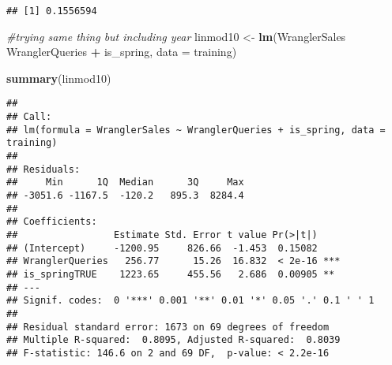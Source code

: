 \documentclass[]{article}
\newenvironment{Shaded}{\begin{snugshade}}{\end{snugshade}}
\newcommand{\KeywordTok}[1]{\textcolor[rgb]{0.13,0.29,0.53}{\textbf{#1}}}
\newcommand{\DataTypeTok}[1]{\textcolor[rgb]{0.13,0.29,0.53}{#1}}
\newcommand{\DecValTok}[1]{\textcolor[rgb]{0.00,0.00,0.81}{#1}}
\newcommand{\StringTok}[1]{\textcolor[rgb]{0.31,0.60,0.02}{#1}}
\newcommand{\CommentTok}[1]{\textcolor[rgb]{0.56,0.35,0.01}{\textit{#1}}}
\newcommand{\OperatorTok}[1]{\textcolor[rgb]{0.81,0.36,0.00}{\textbf{#1}}}
\newcommand{\NormalTok}[1]{#1}
\begin{document}
\begin{verbatim}
## [1] 0.1556594
\end{verbatim}

\begin{Shaded}
\begin{Highlighting}[]
\CommentTok{#trying same thing but including year}
\NormalTok{linmod10 <-}\StringTok{ }\KeywordTok{lm}\NormalTok{(WranglerSales }\OperatorTok{~}\StringTok{ }\NormalTok{WranglerQueries }\OperatorTok{+}\StringTok{ }\NormalTok{is_spring, }\DataTypeTok{data =}\NormalTok{ training)}

\KeywordTok{summary}\NormalTok{(linmod10)}
\end{Highlighting}
\end{Shaded}

\begin{verbatim}
## 
## Call:
## lm(formula = WranglerSales ~ WranglerQueries + is_spring, data = training)
## 
## Residuals:
##     Min      1Q  Median      3Q     Max 
## -3051.6 -1167.5  -120.2   895.3  8284.4 
## 
## Coefficients:
##                 Estimate Std. Error t value Pr(>|t|)    
## (Intercept)     -1200.95     826.66  -1.453  0.15082    
## WranglerQueries   256.77      15.26  16.832  < 2e-16 ***
## is_springTRUE    1223.65     455.56   2.686  0.00905 ** 
## ---
## Signif. codes:  0 '***' 0.001 '**' 0.01 '*' 0.05 '.' 0.1 ' ' 1
## 
## Residual standard error: 1673 on 69 degrees of freedom
## Multiple R-squared:  0.8095, Adjusted R-squared:  0.8039 
## F-statistic: 146.6 on 2 and 69 DF,  p-value: < 2.2e-16
\end{verbatim}

\begin{Shaded}
\end{Shaded}
\end{document}
